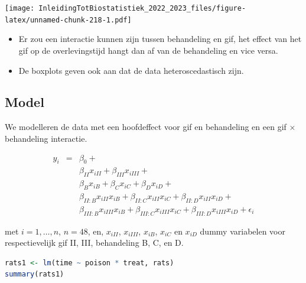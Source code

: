 \documentclass[
  12pt,dutch,coursenotes]{book}
\providecommand{\tightlist}{%
  \setlength{\itemsep}{0pt}\setlength{\parskip}{0pt}}
\begin{document}
\texttt{[image: InleidingTotBiostatistiek\_2022\_2023\_files/figure-latex/unnamed-chunk-218-1.pdf]}

\begin{itemize}
\tightlist
\item
  Er zou een interactie kunnen zijn tussen behandeling en gif, het effect van het gif op de overlevingstijd hangt dan af van de behandeling en vice versa.
\item
  De boxplots geven ook aan dat de data heteroscedastisch zijn.
\end{itemize}

\hypertarget{model-4}{%
\subsection{Model}\label{model-4}}

We modelleren de data met een hoofdeffect voor gif en behandeling en een gif \(\times\) behandeling interactie.

\[
\begin{array}{lcl}
y_i &=& \beta_0  + \\
&&\beta_{II} x_{iII} + \beta_{III} x_{iIII} + \\
&& \beta_{B} x_{iB}  + \beta_{C} x_{iC} + \beta_{D} x_{iD} + \\
&&\beta_{II:B}x_{iII}x_{iB} + \beta_{II:C}x_{iII}x_{iC}  + \beta_{II:D}x_{iII}x_{iD} + \\
&&\beta_{III:B}x_{iIII}x_{iB} + \beta_{III:C}x_{iIII}x_{iC}  + \beta_{III:D}x_{iIII}x_{iD} +
\epsilon_i
\end{array}
\]

met \(i = 1, \ldots, n\), \(n=48\), en, \(x_{iII}\), \(x_{iIII}\), \(x_{iB}\), \(x_{iC}\) en \(x_{iD}\) dummy variabelen voor respectievelijk gif II, III, behandeling B, C, en D.

\begin{lstlisting}[language=R]
rats1 <- lm(time ~ poison * treat, rats)
summary(rats1)
\end{lstlisting}
\end{document}
